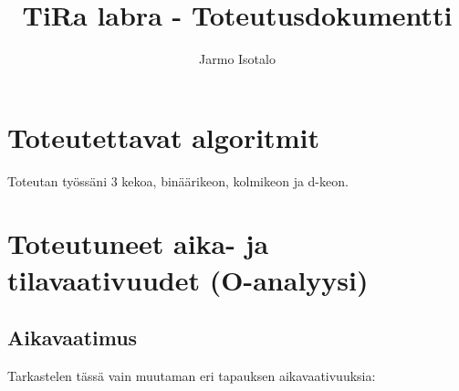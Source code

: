 \documentclass[a4paper,12pt]{article}
\begin{document}
\title{TiRa labra - Toteutusdokumentti} 
\author{Jarmo Isotalo}
\maketitle

\section{Toteutettavat algoritmit}

Toteutan työssäni 3 kekoa, binäärikeon, kolmikeon ja d-keon.

\section{Toteutuneet aika- ja tilavaativuudet (O-analyysi)}
\subsection{Aikavaatimus}
Tarkastelen tässä vain muutaman eri tapauksen aikavaativuuksia:
\end{document}
